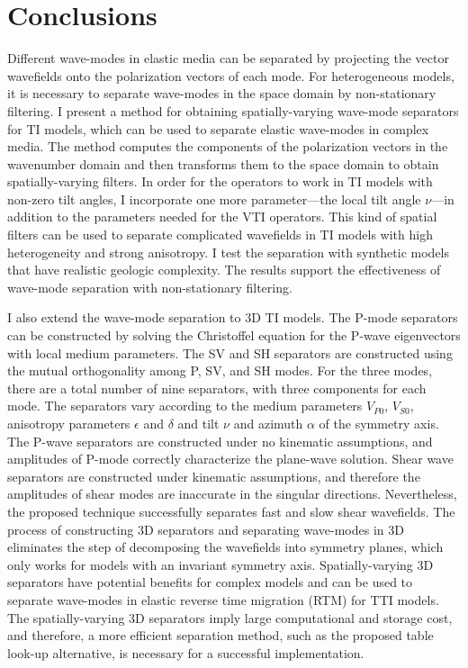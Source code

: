 \section{Conclusions}
Different wave-modes in elastic media can be separated by projecting
the vector wavefields onto the polarization vectors of each mode.  For
heterogeneous models, it is necessary to separate wave-modes in the
space domain by non-stationary filtering.  I present a method for
obtaining spatially-varying wave-mode separators for TI models, which
can be used to separate elastic wave-modes in complex media. The
method computes the components of the polarization vectors in the
wavenumber domain and then transforms them to the space domain to
obtain spatially-varying filters. In order for the operators to work
in TI models with non-zero tilt angles, I incorporate one more
parameter---the local tilt angle $\nu$---in addition to the parameters
needed for the VTI operators. This kind of spatial filters can be used
to separate complicated wavefields in TI models with high
heterogeneity and strong anisotropy. I test the separation with
synthetic models that have realistic geologic complexity. The results
support the effectiveness of wave-mode separation with non-stationary
filtering.

I also extend the wave-mode separation to 3D TI models. The P-mode
separators can be constructed by solving the Christoffel equation for
the P-wave eigenvectors with local medium parameters.  The SV and SH
separators are constructed using the mutual orthogonality among P, SV,
and SH modes.  For the three modes, there are a total number of nine
separators, with three components for each mode. The separators vary
according to the medium parameters $V_{P0}$, $V_{S0}$, anisotropy
parameters $\epsilon$ and $\delta$ and tilt $\nu$ and azimuth $\alpha$
of the symmetry axis. The P-wave separators are constructed under no
kinematic assumptions, and amplitudes of P-mode correctly characterize
the plane-wave solution. Shear wave separators are constructed under
kinematic assumptions, and therefore the amplitudes of shear modes are
inaccurate in the singular directions. Nevertheless, the proposed
technique successfully separates fast and slow shear wavefields. The
process of constructing 3D separators and separating wave-modes in 3D
eliminates the step of decomposing the wavefields into symmetry
planes, which only works for models with an invariant symmetry
axis. Spatially-varying 3D separators have potential benefits for
complex models and can be used to separate wave-modes in elastic
reverse time migration (RTM) for TTI models. The spatially-varying 3D
separators imply large computational and storage cost, and therefore, a
more efficient separation method, such as the proposed table look-up
alternative, is necessary for a successful implementation.
